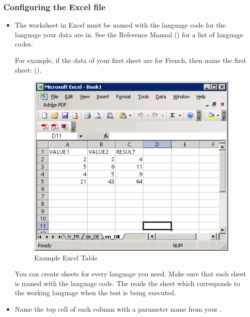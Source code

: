 \subsubsection{Configuring the Excel file}
\label{TasksConfigureExcel}
\begin{itemize}
\item The worksheet in Excel must be named with the language code for the language your data are in. See the Reference Manual () for a list of language codes.

For example, if the data of your first sheet are for French, then name the first sheet:  ().

\begin{figure}[h]
\begin{center}
\includegraphics{Tasks/Testdata/PS/excelexample}
\caption{Example Excel Table}
\label{excel}
\end{center}
\end{figure}

You can create sheets for every language you need. Make sure that each sheet is named with the language code. The \ite{} reads the sheet which corresponds to the working language when the test is being executed. 

\item Name the top cell of each column with a parameter name from your \gdcase{}.


\end{itemize}
